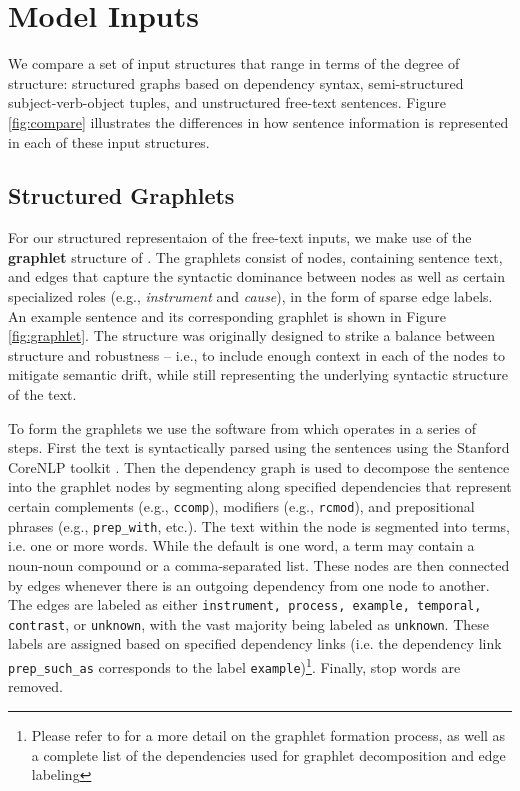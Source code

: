 \section{Model Inputs}
\label{sec:inputs}

We compare a set of input structures that range in terms of the degree of structure: structured graphs based on dependency syntax, semi-structured subject-verb-object tuples, and unstructured free-text sentences.  Figure \ref{fig:compare} illustrates the differences in how sentence information is represented in each of these input structures.

\subsection{Structured Graphlets}
\label{sec:graphlet}

For our structured representaion of the free-text inputs, we make use of the \textbf{graphlet} structure of \citet{jansen2017framing}.  The graphlets consist of nodes, containing sentence text, and edges that capture the syntactic dominance between nodes as well as certain specialized roles (e.g., \emph{instrument} and \emph{cause}), in the form of sparse edge labels.  An example sentence and its corresponding graphlet is shown in Figure \ref{fig:graphlet}.   
The structure was originally designed to strike a balance between structure and robustness -- i.e., to include enough context in each of the nodes to mitigate semantic drift, while still representing the underlying syntactic structure of the text.  %

To form the graphlets we use the software from \citet{jansen2017framing} which operates in a series of steps.  First the text is syntactically parsed using the sentences using the Stanford CoreNLP toolkit \cite{manning2014stanford}.  Then the dependency graph is used to decompose the sentence into the graphlet nodes by segmenting along specified dependencies that represent certain complements (e.g., \texttt{ccomp}), modifiers (e.g., \texttt{rcmod}), and prepositional phrases (e.g., \texttt{prep\_with}, etc.).  The text within the node is segmented into terms, i.e. one or more words.  While the default is one word, a term may contain a noun-noun compound or a comma-separated list.  These nodes are then connected by edges whenever there is an outgoing dependency from one node to another.  The edges are labeled as either \texttt{instrument, process, example, temporal, contrast}, or \texttt{unknown}, with the vast majority being labeled as \texttt{unknown}.  These labels are assigned based on specified dependency links (i.e. the dependency link \texttt{prep\_such\_as} corresponds to the label \texttt{example})\footnote{Please refer to \citet{jansen2017framing} for a more detail on the graphlet formation process, as well as a complete list of the dependencies used for graphlet decomposition and edge labeling}.  Finally, stop words are removed.

